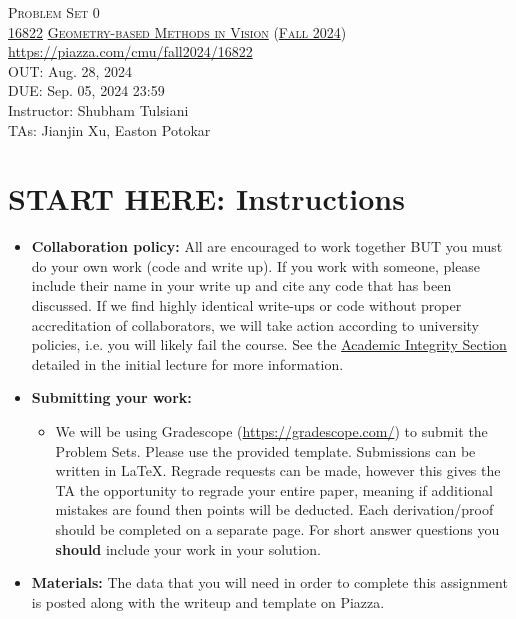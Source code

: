 \documentclass[11pt,addpoints,answers]{exam}
\title{\textsc{\hwName}} %
\author{}
\date{}
\date{}
\numberwithin{equation}{section} %
\numberwithin{figure}{section} %
\numberwithin{table}{section} %
\newcommand{\courseNum}{\href{https://geometric3d.github.io}{16822}}
\newcommand{\courseName}{\href{https://geometric3d.github.io}{Geometry-based Methods in Vision}}
\newcommand{\courseSem}{\href{https://geometric3d.github.io}{Fall 2024}}
\newcommand{\courseUrl}{\url{https://piazza.com/cmu/fall2024/16822}}
\newcommand{\hwNum}{Problem Set 0}
\newcommand{\hwTopic}{Linear Algebra }
\newcommand{\outDate}{Aug. 28, 2024}
\newcommand{\dueDate}{Sep. 05, 2024 23:59}
\newcommand{\instructorName}{Shubham Tulsiani}
\newcommand{\taNames}{Jianjin Xu, Easton Potokar}
\begin{document}
\section*{}
\begin{center}
  \textsc{\LARGE \hwNum} \\
  \vspace{1em}
  \textsc{\large \courseNum{} \courseName{} (\courseSem)} \\
  \courseUrl\\
  \vspace{1em}
  OUT: \outDate \\
  DUE: \dueDate \\
  Instructor: \instructorName \\
  TAs: \taNames
\end{center}

\section*{START HERE: Instructions}
\begin{itemize}
\item \textbf{Collaboration policy:} All are encouraged to work together BUT you must do your own work (code and write up). If you work with someone, please include their name in your write up and cite any code that has been discussed. If we find highly identical write-ups or code without proper accreditation of collaborators, we will take action according to university policies, i.e. you will likely fail the course. See the \href{https://www.dropbox.com/s/z6o0tinc9eaez46/L01_Overview.pdf?dl=0}{Academic Integrity Section} detailed in the initial lecture for more information.


\item\textbf{Submitting your work:}

\begin{itemize}

\item We will be using Gradescope (\url{https://gradescope.com/}) to submit the Problem Sets. Please use the provided template. Submissions can be written in LaTeX. Regrade requests can be made, however this gives the TA the opportunity to regrade your entire paper, meaning if additional mistakes are found then points will be deducted.
Each derivation/proof should be  completed on a separate page. For short answer questions you \textbf{should} include your work in your solution.  
\end{itemize}

\item \textbf{Materials:} The data that you will need in order to complete this assignment is posted along with the writeup and template on Piazza.

\end{itemize}
\end{document}
